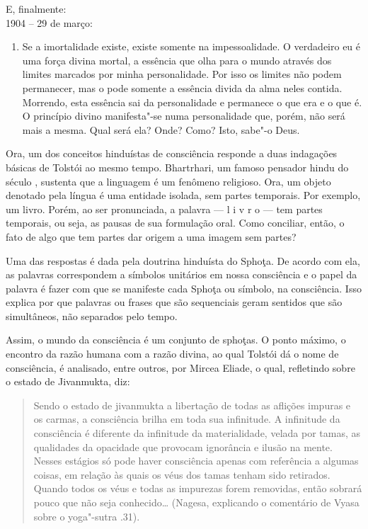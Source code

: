 E, finalmente: \\

1904 -- 29 de março:

\begin{enumerate}
\def\labelenumi{\arabic{enumi})}
\setcounter{enumi}{12}
\item
Se a imortalidade existe, existe somente na impessoalidade. O verdadeiro
eu é uma força divina mortal, a essência que olha para o mundo através
dos limites marcados por minha personalidade. Por isso os limites não
podem permanecer, mas o pode somente a essência divida da alma neles
contida. Morrendo, esta essência sai da personalidade e permanece o que
era e o que é. O princípio divino manifesta"-se numa personalidade que,
porém, não será mais a mesma. Qual será ela? Onde? Como? Isto, sabe"-o
Deus.
\end{enumerate}

Ora, um dos conceitos hinduístas de consciência responde a duas
indagações básicas de Tolstói ao mesmo tempo.
Bhartrhari, um famoso pensador hindu do século ,
sustenta que a linguagem é um fenômeno religioso. Ora, um objeto
denotado pela língua é uma entidade isolada, sem partes temporais. Por
exemplo, um livro. Porém, ao ser pronunciada, a palavra --- l i v r o
--- tem partes temporais, ou seja, as pausas de sua formulação oral.
Como conciliar, então, o fato de algo que tem partes dar origem a uma
imagem sem partes?

Uma das respostas é dada pela doutrina hinduísta do Sphoţa. De acordo
com ela, as palavras correspondem a símbolos unitários em nossa
consciência e o papel da palavra é fazer com que se manifeste cada
Sphoţa ou símbolo, na consciência. Isso explica por que palavras ou
frases que são sequenciais geram sentidos que são simultâneos, não
separados pelo tempo.

Assim, o mundo da consciência é um conjunto de sphoţas. O ponto máximo,
o encontro da razão humana com a razão divina, ao qual Tolstói dá o nome
de consciência, é analisado, entre outros, por Mircea
Eliade, o qual, refletindo sobre o estado de
Jivanmukta, diz:

\begin{quote}
Sendo o estado de jivanmukta a libertação de todas as
aflições impuras e os carmas, a consciência brilha em toda sua
infinitude. A infinitude da consciência é diferente da infinitude da
materialidade, velada por tamas, as qualidades da opacidade que provocam ignorância e ilusão na
mente. Nesses estágios só pode haver
consciência apenas com referência a algumas coisas, em relação às quais
os véus dos tamas tenham sido retirados. Quando todos os véus e todas as
impurezas forem removidas, então sobrará pouco que não seja
conhecido\ldots{} (Nagesa, explicando o comentário de Vyasa sobre o
yoga"-sutra .31).
\end{quote}

